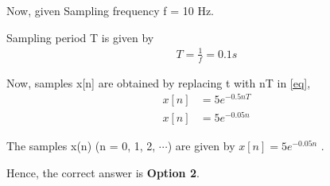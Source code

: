 \documentclass[journal,12pt,twocolumn]{IEEEtran}
\begin{document}
Now, given Sampling frequency f = 10 Hz.

Sampling period T is given by
\begin{align}
    T = \frac{1}{f} = 0.1 s
\end{align}

Now, samples x[n] are obtained by replacing t with nT in \eqref{eq},
\begin{align}
    x[n] &= 5e^{-0.5nT} \\
    x[n] &= 5e^{-0.05n}
\end{align}

The samples x(n) (n = 0, 1, 2, $\cdots$) are given by $x[n] = 5e^{-0.05n}$ .

Hence, the correct answer is \textbf{Option 2}.
\end{document}
